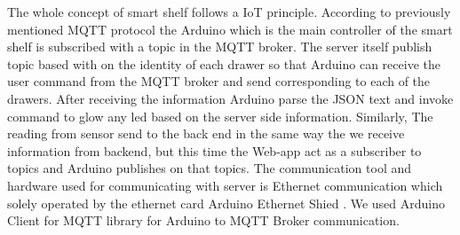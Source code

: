 The whole concept of smart shelf follows a IoT principle. According to previously mentioned MQTT protocol the Arduino which is the main controller of the smart shelf is subscribed with a topic in the MQTT broker. The server itself publish topic based with on the identity of each drawer so that Arduino can receive the user command from the MQTT broker and send corresponding to each of the drawers. After receiving the information Arduino parse the JSON text and invoke command to glow any led based on the server side information. Similarly, The reading from sensor send to the back end in the same way the we receive information from backend, but this time the Web-app act as a subscriber to topics and Arduino publishes on that topics.  The communication tool and hardware used for communicating with server is Ethernet communication which solely operated by the ethernet card Arduino Ethernet Shied \cite{RefWorks:EthernetArduino}. We used Arduino Client for MQTT \cite{RefWorks:MQTTArduino} library for Arduino to MQTT Broker communication.
